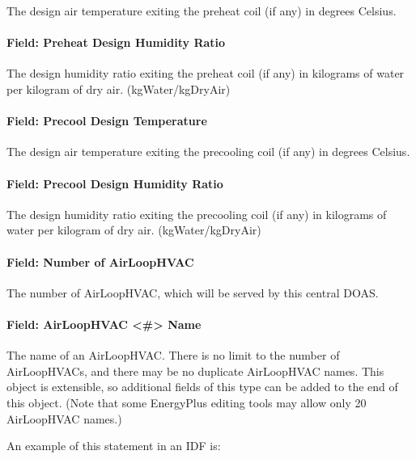 The design air temperature exiting the preheat coil (if any) in degrees Celsius.

\paragraph{Field: Preheat Design Humidity Ratio}

The design humidity ratio exiting the preheat coil (if any) in kilograms of water per kilogram of dry air. (kgWater/kgDryAir)

\paragraph{Field: Precool Design Temperature}

The design air temperature exiting the precooling coil (if any) in degrees Celsius.

\paragraph{Field: Precool Design Humidity Ratio}

The design humidity ratio exiting the precooling coil (if any) in kilograms of water per kilogram of dry air. (kgWater/kgDryAir)

\paragraph{Field: Number of AirLoopHVAC}\label{field-number-of-airloophvac}

The number of AirLoopHVAC, which will be served by this central DOAS.

\paragraph{Field: AirLoopHVAC \textless{}\#\textgreater{} Name}\label{field-airloophvac-name}

The name of an AirLoopHVAC. There is no limit to the number of AirLoopHVACs, and there may be no duplicate AirLoopHVAC names.  This object is extensible, so additional fields of this type can be added to the end of this object.  (Note that some EnergyPlus editing tools may allow only 20 AirLoopHVAC names.)

An example of this statement in an IDF is:

